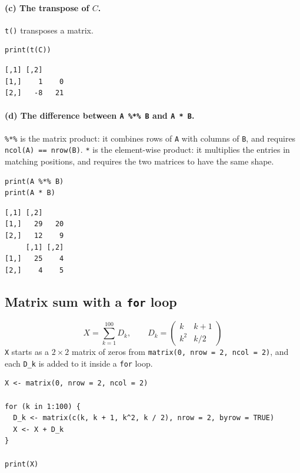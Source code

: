 \documentclass[11pt]{article}
\newcommand{\code}[1]{\texttt{#1}}
\begin{document}
\paragraph{(c) The transpose of $C$.}
\code{t()} transposes a matrix.

\begin{lstlisting}[style=Rcode]
print(t(C))
\end{lstlisting}

\begin{lstlisting}[style=Routput]
     [,1] [,2]
[1,]    1    0
[2,]   -8   21
\end{lstlisting}

\paragraph{(d) The difference between \texttt{A \%*\% B} and \texttt{A * B}.}
\code{\%*\%} is the matrix product: it combines rows of \code{A} with columns of
\code{B}, and requires \code{ncol(A) == nrow(B)}. \code{*} is the element-wise
product: it multiplies the entries in matching positions, and requires the two
matrices to have the same shape.

\begin{lstlisting}[style=Rcode]
print(A %*% B)
print(A * B)
\end{lstlisting}

\begin{lstlisting}[style=Routput]
     [,1] [,2]
[1,]   29   20
[2,]   12    9
     [,1] [,2]
[1,]   25    4
[2,]    4    5
\end{lstlisting}

\subsection{Matrix sum with a \texttt{for} loop}
\label{sec:q1-loop}

\[
X = \sum_{k=1}^{100} D_k,
\qquad
D_k = \begin{pmatrix} k & k+1\\ k^2 & k/2 \end{pmatrix}
\]
\code{X} starts as a $2\times2$ matrix of zeros from \code{matrix(0, nrow = 2,
ncol = 2)}, and each \code{D\_k} is added to it inside a \code{for} loop.

\begin{lstlisting}[style=Rcode]
X <- matrix(0, nrow = 2, ncol = 2)

for (k in 1:100) {
  D_k <- matrix(c(k, k + 1, k^2, k / 2), nrow = 2, byrow = TRUE)
  X <- X + D_k
}

print(X)
\end{lstlisting}
\end{document}
